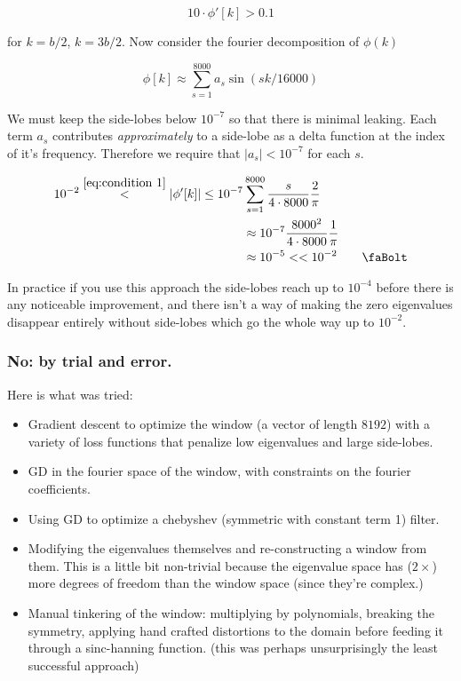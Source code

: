 \documentclass[12pt]{article}
\begin{document}
\begin{equation}\label{eq:condition 1}10\cdot \phi'[k] > 0.1\end{equation} 

for $k=b/2$, $k=3b/2$. Now consider the fourier decomposition of $\phi(k)$

\begin{equation}\label{eq:fourier decomposition}
    \phi[k] \approx \sum_{s=1}^{8000} a_s \sin( s k/16000 )  
\end{equation}

We must keep the side-lobes below $10^{-7}$ so that there is minimal leaking. Each term $a_s$ contributes \textit{approximately} to a side-lobe as a delta function at the index of it's frequency. Therefore we require that $|a_s| < 10^{-7}$ for each $s$.

\begin{equation}
\begin{split}
    10^{-2} \stackrel{\eqref{eq:condition 1}}{<} |\phi'[k]| \leq 10^{-7} &\sum_{s=1}^{8000} \frac{s}{4\cdot 8000}\frac{2}{\pi}\\
    &\approx 10^{-7} \frac{8000^2}{4\cdot 8000}\frac{1}{\pi} \\
    &\approx 10^{-5} << 10^{-2}\qquad \text{\faBolt}
\end{split}
\end{equation}

In practice if you use this approach the side-lobes reach up to $10^{-4}$ before there is any noticeable improvement, and there isn't a way of making the zero eigenvalues disappear entirely without side-lobes which go the whole way up to $10^{-2}$. \\ 

\subsubsection{No: by trial and error.}
Here is what was tried:
\begin{itemize}
    \item Gradient descent to optimize the window (a vector of length $8192$) with a variety of loss functions that penalize low eigenvalues and large side-lobes. 
    \item GD in the fourier space of the window, with constraints on the fourier coefficients.
    \item Using GD to optimize a chebyshev (symmetric with constant term 1) filter.
    \item Modifying the eigenvalues themselves and re-constructing a window from them. This is a little bit non-trivial because the eigenvalue space has ($2\times$) more degrees of freedom than the window space (since they're complex.)
    \item Manual tinkering of the window: multiplying by polynomials, breaking the symmetry, applying hand crafted distortions to the domain before feeding it through a sinc-hanning function. (this was perhaps unsurprisingly the least successful approach)
\end{itemize}
\end{document}
